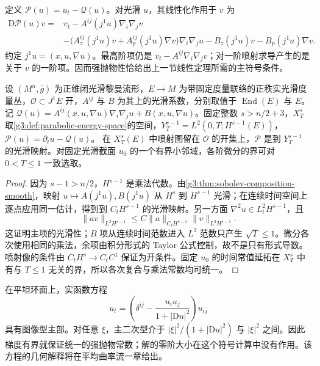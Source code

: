 定义 \(\mathscr P(u)=u_t-\mathcal Q(u)\)。对光滑 \(u\)，其线性化作用于 \(v\) 为
\begin{equation}\label{g3:eq:quasilinear-parabolic-linearization}
	\begin{split}
	\mathrm D\mathscr P(u)v={}&v_t-A^{ij}(j^1u)\nabla_i\nabla_jv\\
	&-\bigl(A_z^{ij}(j^1u)v+A_p^{ij}(j^1u)\nabla v\bigr)\nabla_i\nabla_j u
	-B_z(j^1u)v-B_p(j^1u)\nabla v.
	\end{split}
	\end{equation}
约定 \(j^1u=(x,u,\nabla u)\)。最高阶项仍是 \(v_t-A^{ij}\nabla_i\nabla_jv\)；对一阶喷射求导产生的是关于 \(v\) 的一阶项。因而强抛物性恰给出上一节线性定理所需的主符号条件。

\begin{lemma}\label{g3:lem:quasilinear-parabolic-smooth-map}
	设 \((M^n,\bar g)\) 为正维闭光滑黎曼流形，\(E\to M\) 为带固定度量联络的正秩实光滑度量丛，\(\mathcal O\subset J^1E\) 开，\(A^{ij}\) 与 \(B\) 为其上的光滑系数，分别取值于 \(\operatorname{End}(E)\) 与 \(E\)。记 \(\mathcal Q(u)=A^{ij}(x,u,\nabla u)\nabla_i\nabla_ju+B(x,u,\nabla u)\)。固定整数 \(s>n/2+3\)，\(X_T^s\) 取\cref{g3:def:parabolic-energy-space}的空间，\(Y_T^{s-1}=L^2(0,T;H^{s-1}(E))\)，\(\mathscr P(u)=\partial_tu-\mathcal Q(u)\)。
	在 \(X_T^s(E)\) 中喷射图留在 \(\mathcal O\) 的开集上，\(\mathscr P\) 是到 \(Y_T^{s-1}\) 的光滑映射。对固定光滑截面 \(u_0\) 的一个有界小邻域，各阶微分的界可对 \(0<T\le1\) 一致选取。
\end{lemma}
\begin{proof}
	因为 \(s-1>n/2\)，\(H^{s-1}\) 是乘法代数。由\cref{g3:thm:sobolev-composition-smooth}，映射 \(u\mapsto A(j^1u),B(j^1u)\) 从 \(H^s\) 到 \(H^{s-1}\) 光滑；在连续时间空间上逐点应用同一估计，得到到 \(C_tH^{s-1}\) 的光滑映射。另一方面 \(\nabla^2u\in L^2_tH^{s-1}\)，且
	\[
		\|av\|_{L^2H^{s-1}}
		\le C\|a\|_{C_tH^{s-1}}\|v\|_{L^2H^{s-1}}.
	\]
	这证明主项的光滑性；\(B\) 项从连续时间范数进入 \(L^2\) 范数只产生 \(\sqrt T\le1\)。微分各次使用相同的乘法，余项由积分形式的 Taylor 公式控制，故不是只有形式导数。喷射像的条件由 \(C_tH^s\to C_tC^1\) 保证为开条件。固定 \(u_0\) 的时间常值延拓在 \(X_T^s\) 中有与 \(T\le1\) 无关的界，所以各次复合与乘法常数均可统一。
\end{proof}

\begin{example}\label{g3:exm:graph-parabolic-symbol}
	在平坦环面上，实函数方程
	\[
		u_t=\left(\delta^{ij}-\frac{u_i u_j}{1+|\mathrm Du|^2}\right)u_{ij}
	\]
	具有图像型主部。对任意 \(\xi\)，主二次型介于 \(|\xi|^2/(1+|\mathrm Du|^2)\) 与 \(|\xi|^2\) 之间。因此梯度有界就保证统一的强抛物常数；解的零阶大小在这个符号计算中没有作用。该方程的几何解释将在平均曲率流一章给出。
\end{example}

